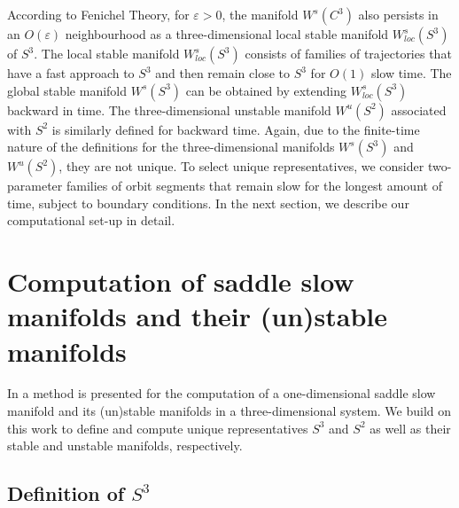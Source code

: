 \documentclass{ws-ijbc}
\begin{document}
According to Fenichel Theory, for $\varepsilon > 0$, the manifold $W^{s}(C^3)$ also persists in an $O(\varepsilon)$ neighbourhood as a three-dimensional local stable manifold $W^{s}_{loc}(S^3)$ of $S^3$.  The local stable manifold $W^{s}_{loc}(S^3)$ consists of families of trajectories that have a fast approach to $S^3$ and then remain close to $S^3$ for $O(1)$ slow time.  The global stable manifold $W^{s}(S^3)$ can be obtained by extending $W^{s}_{loc}(S^3)$ backward in time.  The three-dimensional unstable manifold $W^{u}(S^2)$ associated with $S^2$ is similarly defined for backward time.  Again, due to the finite-time nature of the definitions for the three-dimensional manifolds $W^{s}(S^3)$ and $W^{u}(S^2)$, they are not unique.  To select unique representatives, we consider two-parameter families of orbit segments that remain slow for the longest amount of time, subject to boundary conditions.  In the next section, we describe our computational set-up in detail.  
 

\section{Computation of saddle slow manifolds and their (un)stable manifolds}
\label{sec:slowmans}
%
In \cite{Saeed_Paper} a method is presented for the computation of a one-dimensional saddle slow manifold and its (un)stable manifolds in a three-dimensional system.  We build on this work to define and compute unique representatives $S^3$ and $S^2$ as well as their stable and unstable manifolds, respectively.

\subsection{Definition of $S^3$}    
\label{sec:S3}
\end{document}

